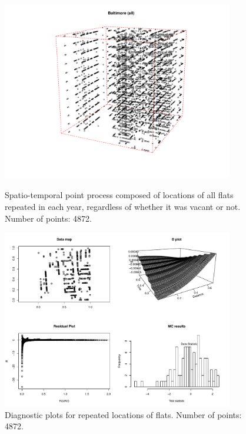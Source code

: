 \documentclass{article}
\begin{document}
\begin{figure}[p]
  \centering
    \includegraphics[width=0.9\textwidth]{PP_balt_full.pdf}
  \caption{Spatio-temporal point process composed of locations of all flats repeated in each year, regardless of whether it was vacant or not. Number of points: 4872. }
  \label{fig:baltallPP}

\vspace*{\floatsep}

    \includegraphics[width=0.9\textwidth]{diag_balt_full.pdf}
  \caption{Diagnostic plots for repeated locations of flats. Number of points: 4872. } 
  \label{fig:baltallDiag}
\end{figure}








\end{document}
